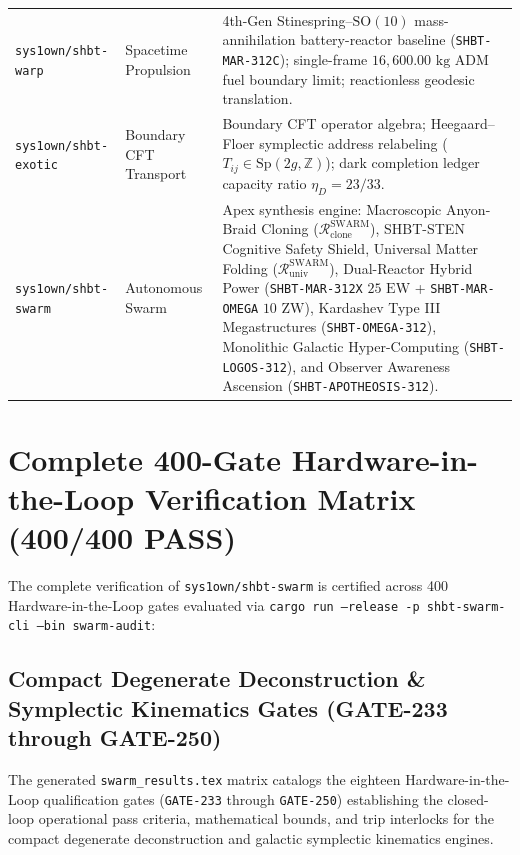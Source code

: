 \documentclass[11pt,onecolumn]{article}
\begin{document}
\begin{table}[!htbp]
{\begin{tabularx}{\linewidth}{@{}p{3.6cm} p{3.0cm} X@{}}
\addlinespace
\texttt{sys1own/shbt-warp} & Spacetime Propulsion & 4th-Gen Stinespring--$\text{SO}(10)$ mass-annihilation battery-reactor baseline (\texttt{SHBT-MAR-312C}); single-frame $16{,}600.00\text{ kg}$ ADM fuel boundary limit; reactionless geodesic translation. \\
\addlinespace
\texttt{sys1own/shbt-exotic} & Boundary CFT Transport & Boundary CFT operator algebra; Heegaard--Floer symplectic address relabeling ($T_{ij} \in \text{Sp}(2g, \mathbb{Z})$); dark completion ledger capacity ratio $\eta_D = 23/33$. \\
\addlinespace
\texttt{sys1own/shbt-swarm} & Autonomous Swarm & Apex synthesis engine: Macroscopic Anyon-Braid Cloning ($\mathcal{R}_{\text{clone}}^{\text{SWARM}}$), SHBT-STEN Cognitive Safety Shield, Universal Matter Folding ($\mathcal{R}_{\text{univ}}^{\text{SWARM}}$), Dual-Reactor Hybrid Power (\texttt{SHBT-MAR-312X} $25\text{ EW}$ + \texttt{SHBT-MAR-OMEGA} $10\text{ ZW}$), Kardashev Type III Megastructures (\texttt{SHBT-OMEGA-312}), Monolithic Galactic Hyper-Computing (\texttt{SHBT-LOGOS-312}), and Observer Awareness Ascension (\texttt{SHBT-APOTHEOSIS-312}). \\
\bottomrule
\end{tabularx}%
}
\end{table}
\FloatBarrier
\appendix
\section{Complete 400-Gate Hardware-in-the-Loop Verification Matrix (400/400 PASS)}
\label{sec:hil_matrix_320}
The complete verification of \texttt{sys1own/shbt-swarm} is certified across 400 Hardware-in-the-Loop gates evaluated via \texttt{cargo run --release -p shbt-swarm-cli --bin swarm-audit}:

\FloatBarrier

\FloatBarrier

\subsection{Compact Degenerate Deconstruction \& Symplectic Kinematics Gates (GATE-233 through GATE-250)}
\label{subsec:gate_233_250_table}
The generated \texttt{swarm\_results.tex} matrix catalogs the eighteen Hardware-in-the-Loop qualification gates (\texttt{GATE-233} through \texttt{GATE-250}) establishing the closed-loop operational pass criteria, mathematical bounds, and trip interlocks for the compact degenerate deconstruction and galactic symplectic kinematics engines.
\end{document}
